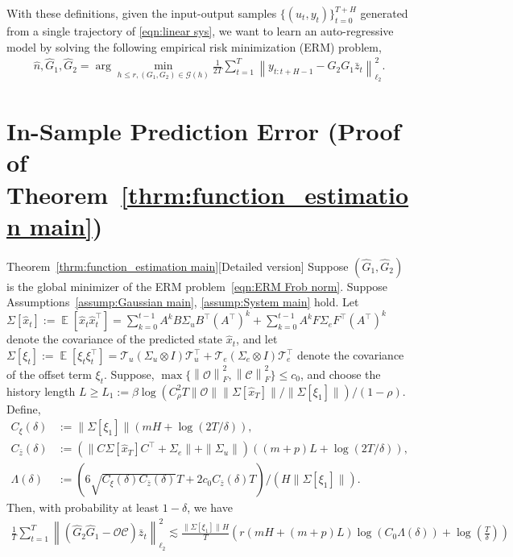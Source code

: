 \documentclass[11pt]{article}
\newcommand{\zbar}{\bar{z}}
\newcommand{\xtil}{\hat{x}}
\newcommand{\Ccal}{\mathcal{C}}
\newcommand{\Gcal}{\mathcal{G}}
\newcommand{\Ocal}{\mathcal{O}}
\newcommand{\Tcal}{\mathcal{T}}
\newcommand{\tn}[1]{\left\|{#1}\right\|_{\ell_2}}
\newcommand{\E}{\operatorname{\mathbb{E}}}
\newcommand{\tf}[1]{\left\|{#1}\right\|_{F}}
\newcommand{\norm}[1]{\|{#1} \|}
\newcommand{\T}{\top}
\newcommand{\<}{\langle}
\renewcommand{\>}{\rangle}
\numberwithin{equation}{section}
\begin{document}
With these definitions, given the input-output samples $\{(u_t, y_t)\}_{t=0}^{T+H}$ generated from a single trajectory of \eqref{eqn:linear sys}, we want to learn an auto-regressive model by solving the following empirical risk minimization (ERM) problem, 
\begin{align}
    \hat{n}, \hat{G}_1, \hat{G}_2 = \arg \min_{h\leq r, (G_1,G_2) \in \Gcal(h)} \frac{1}{2T}\sum_{t=1}^{T}\tn{y_{t:t+H-1} - G_2 G_1 \zbar_t}^2. %
    \label{eqn:ERM Frob norm}
\end{align}
%

\section{In-Sample Prediction Error (Proof of Theorem~\ref{thrm:function_estimation main})}\label{app:in-sample prediction error}
\begin{customtheorem}{Theorem~\ref{thrm:function_estimation main}}[Detailed version]\label{thrm:function_estimation}
    Suppose $(\hat{G}_1, \hat{G}_2)$ is the global minimizer of the ERM problem~\eqref{eqn:ERM Frob norm}. 
    Suppose Assumptions~\ref{assump:Gaussian main}, \ref{assump:System main} hold. Let $\Sigma[\xtil_t] := \E\left[\xtil_t \xtil_t^\T\right] = \sum_{k=0}^{t-1} A^k B \Sigma_u B^\T (A^\T)^k + \sum_{k=0}^{t-1} A^k F \Sigma_e F^\T (A^\T)^k$ denote the covariance of the predicted state $\xtil_t$, and let $\Sigma[\xi_t] := \E[\xi_t \xi_t^\T] = \Tcal_u(\Sigma_u \otimes I)\Tcal_u^\T + \Tcal_e(\Sigma_e \otimes I)\Tcal_e^\T$ denote the covariance of the offset term $\xi_t$. Suppose, $\max\{\tf{\Ocal}^2, \tf{\Ccal}^2\} \leq c_0$, and choose the history length $ L \geq L_1 := \beta\log\left(C_\rho^2 T \norm{\Ocal}\norm{\Sigma[\xtil_T]}/\norm{\Sigma[\xi_1]}\right)/(1-\rho)$. Define,
\begin{equation}
\begin{aligned} \label{eqn:C_xi_and_C_zbar}
    C_{\xi}(\delta) &:= \norm{\Sigma[\xi_1]} \left(mH + \log (2T/\delta)\right),  \\
    C_{\zbar}(\delta) &:= (\norm{C\Sigma[\xtil_T]C^\T + \Sigma_e} + \norm{\Sigma_u}) \left( (m+p)L + \log (2T/\delta)\right),  \\
    \Lambda(\delta) &:= \left({6 \sqrt{C_{\xi}(\delta) C_{\zbar}(\delta)}T + 2 c_0 C_{\zbar}(\delta) T}\right)/({H\norm{\Sigma[\xi_1]}}). 
\end{aligned}
\end{equation}
    Then, with probability at least $1-\delta$, we have
    \begin{align}
        \frac{1}{T}\sum_{t=1}^{T}\tn{\left(\hat{G}_2\hat{G}_1 - \Ocal \Ccal\right) \zbar_t}^2 \lesssim \frac{\norm{\Sigma[\xi_1]}H}{T}  \left( r \left(mH + (m+p)L \right)\log \left(C_0 \Lambda(\delta)\right) + \log \left(\frac{T}{\delta}\right) \right)
    \end{align}
\end{customtheorem}
\end{document}
